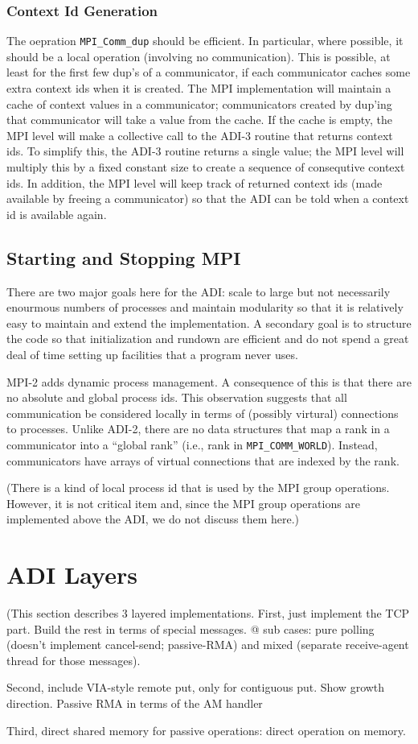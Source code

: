 \documentclass{article}
\def\code#1{\texttt{#1}}
\begin{document}
\subsubsection{Context Id Generation}
\label{sec:context-id-generation}
The oepration \code{MPI_Comm_dup} should be efficient.  In particular,
where possible, it should be a local operation (involving no
communication).  This is possible, at least for the first few dup's of
a communicator, if each communicator caches some extra context ids
when it is created.  The MPI implementation will maintain a cache of
context values in a communicator; communicators created by dup'ing
that communicator will take a value from the cache.  If the cache is
empty, the MPI level will make a collective call to the ADI-3 routine
that returns context ids.  To simplify this, the ADI-3 routine returns
a single value; the MPI level will multiply this by a fixed constant
size to create a sequence of consequtive context ids.  In addition,
the MPI level will keep track of returned context ids (made available
by freeing a communicator) so that the ADI can be told when a context
id is available again.

\subsection{Starting and Stopping MPI}
There are two major goals here for the ADI:  scale to large but not
necessarily enourmous numbers of processes and maintain modularity so
that it is relatively easy to maintain and extend the implementation.
A secondary goal is to structure the code so that initialization and
rundown are efficient and do not spend a great deal of time setting up
facilities that a program never uses.

MPI-2 adds dynamic process management.  A consequence of this is that
there are no absolute and global process ids.  This observation
suggests that all communication be considered locally in terms of
(possibly virtural) connections to processes.  Unlike ADI-2, there are
no data structures that map a rank in a communicator into a ``global
rank'' (i.e., rank in \code{MPI_COMM_WORLD}).  Instead, communicators
have arrays of virtual connections that are indexed by the rank.

(There is a kind of local process id that is used by the MPI group
operations.  However, it is not critical item and, since the MPI group
operations are implemented above the ADI, we do not discuss them here.)

\section{ADI Layers}
\label{sec:layers}

(This section describes 3 layered implementations.  First, just
implement the TCP part.  Build the rest in terms of special messages.
@ sub cases: pure polling (doesn't implement cancel-send; passive-RMA)
and mixed (separate receive-agent thread for those messages).  

Second, include VIA-style remote put, only for contiguous put.  Show
growth direction.  Passive RMA in terms of the AM handler

Third, direct shared memory for passive operations: direct operation
on memory.
\end{document}
